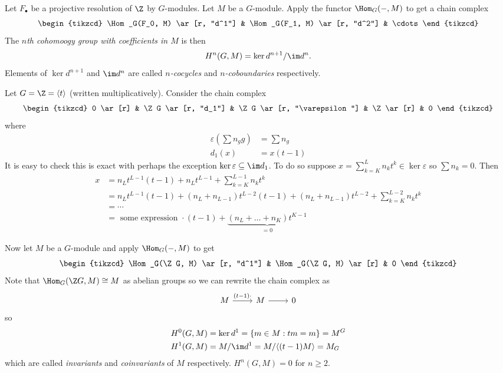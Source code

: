 \documentclass[a4paper]{article}
\begin{document}
\begin{definition}
  Let \(F_\bullet\) be a projective resolution of \(\Z\) by \(G\)-modules. Let \(M\) be a \(G\)-module. Apply the functor \(\Hom_G(-, M)\) to get a chain complex
  \[
    \begin{tikzcd}
      \Hom_G(F_0, M) \ar[r, "d^1"] & \Hom_G(F_1, M) \ar[r, "d^2"] & \cdots
    \end{tikzcd}
  \]
  The \emph{\(n\)th cohomoogy group with coefficients in \(M\)} is then
  \[
    H^n(G, M) = \ker d^{n + 1}/\im d^n.
  \]
  Elements of \(\ker d^{n + 1}\) and \(\im d^n\) are called \emph{\(n\)-cocycles} and \emph{\(n\)-coboundaries} respectively.
\end{definition}

\begin{eg}
  Let \(G = \Z = \langle t\rangle\) (written multiplicatively). Consider the chain complex
  \[
    \begin{tikzcd}
      0 \ar[r] & \Z G \ar[r, "d_1"] & \Z G \ar[r, "\varepsilon"] & \Z \ar[r] & 0
    \end{tikzcd}
  \]
  where
  \begin{align*}
    \varepsilon(\sum n_g g) &= \sum n_g \\
    d_1(x) &= x(t - 1)
  \end{align*}
  It is easy to check this is exact with perhaps the exception \(\ker \varepsilon \subseteq \im d_1\). To do so suppose \(x = \sum_{k = K}^L n_k t^k \in \ker \varepsilon\) so \(\sum n_k = 0\). Then
  \begin{align*}
    x &= n_L t^{L - 1} (t - 1) + n_L t^{L - 1} + \sum_{k = K}^{L - 1} n_k t^k \\
      &= n_L t^{L - 1} (t - 1) + (n_L + n_{L - 1})t^{L - 2} (t - 1) + (n_L + n_{L - 1})t^{L - 2} + \sum_{k = K}^{L - 2} n_k t^k \\
      &= \cdots \\
      &= \text{ some expression } \cdot (t - 1) + \underbrace{(n_L + \dots + n_K) t^{K - 1}}_{= 0}
  \end{align*}

  Now let \(M\) be a \(G\)-module and apply \(\Hom_G(-, M)\) to get
  \[
    \begin{tikzcd}
      \Hom_G(\Z G, M) \ar[r, "d^1"] & \Hom_G(\Z G, M) \ar[r] & 0
    \end{tikzcd}
  \]
  Note that \(\Hom_G(\Z G, M) \cong M\) as abelian groups so we can rewrite the chain complex as
  \[
    \begin{tikzcd}
      M \ar[r, "(t - 1) \cdot "] & M \ar[r] & 0
    \end{tikzcd}
  \]
  so
  \begin{align*}
    H^0(G, M) &= \ker d^1 = \{m \in M: tm = m\} = M^G \\
    H^1(G, M) &= M/\im d^1 = M/\langle (t - 1) M\rangle = M_G
  \end{align*}
  which are called \emph{invariants} and \emph{coinvariants} of \(M\) respectively. \(H^n(G, M) = 0\) for \(n \geq 2\).
\end{eg}
\end{document}
